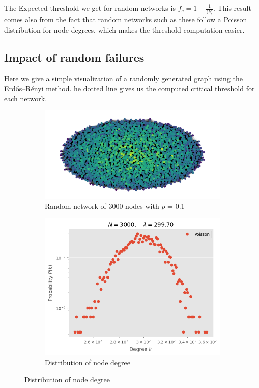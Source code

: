 \documentclass[
]{article}
\begin{document}
The Expected threshold we get for random networks is
\(f_c = 1-\frac{1}{ \langle k \rangle}\). This result comes also from
the fact that random networks such as these follow a Poisson
distribution for node degrees, which makes the threshold computation
easier.

\hypertarget{impact-of-random-failures}{%
\subsection{Impact of random failures}\label{impact-of-random-failures}}

Here we give a simple visualization of a randomly generated graph using
the Erdős--Rényi method. he dotted line gives us the computed critical
threshold for each network.

\begin{figure}
  \centering
  \begin{subfigure}{0.4\textwidth}
  \includegraphics{./assets/3000_draw.png}
  \caption{Random network of 3000 nodes with \(p\) = 0.1}
  \end{subfigure}
  \hfill  
  \begin{subfigure}{0.4\textwidth}
  \centering
  \includegraphics{./assets/3000_poisson.png}
  \caption{Distribution of node degree}
  \end{subfigure}
\end{figure}
\end{document}
